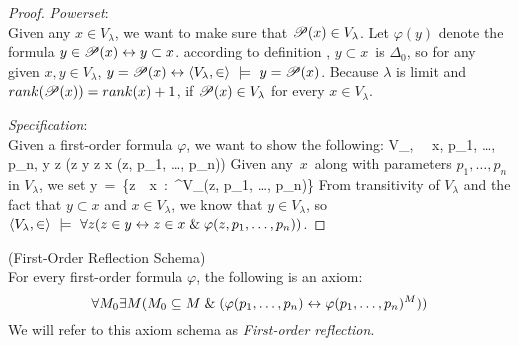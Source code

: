 \begin{proof}
\item \emph{Powerset}: \\
Given any $x \in V_\lambda$, we want to make sure that $\mathscr{P} (x) \in V_\lambda$. Let $\varphi(y)$ denote the formula $y \in \mathscr{P} (x) \leftrightarrow y \subset x$.
according to definition , $y \subset x$ is $\Delta_0$, so for any given $x, y \in V_\lambda$, $y = \mathscr{P} (x) \leftrightarrow \langle V_\lambda, \in \rangle~\models~y = \mathscr{P} (x)$.
Because $\lambda$ is limit and $rank(\mathscr{P} (x)) = rank(x)+1$, if $\mathscr{P} (x) \in V_\lambda$ for every $x \in V_\lambda$.

\item \emph{Specification}: \\ %
Given a first-order formula $\varphi$, we want to show the following:
\beq
\langle V_\lambda, \in \rangle~\models~\forall x, p_1, \ldots, p_n, \exists y \forall z (z \in y \iff z \in x \et \varphi(z, p_1, \ldots, p_n))
\eeq
Given any~$x$~along with parameters $p_1, \ldots, p_n$ in $V_\lambda$, we set
\beq
y~=~\{z~\in~x~:~\varphi^{V_\lambda}(z, p_1, \ldots, p_n)\}
\eeq
From transitivity of $V_\lambda$ and the fact that $y \subset x$ and $x \in V_\lambda$, we know that $y \in V_\lambda$, 
so $\langle V_\lambda, \in \rangle~\models~\forall z (z \in y \leftrightarrow z \in x \mathrel{\&} \varphi(z, p_1, \dots, p_n))$.
\ece
\end{proof}

\begin{definition}{(First-Order Reflection Schema)}\label{def:first_order_reflection}\\ %
For every first-order formula $\varphi$, the following is an axiom:
\begin{equation}
\forall M_0 \exists M (M_0 \subseteq M \et (\varphi(p_1, \ldots, p_n) \iff \varphi(p_1, \ldots, p_n)^M)) %
\end{equation}
We will refer to this axiom schema as \emph{First-order reflection}.
\end{definition}


